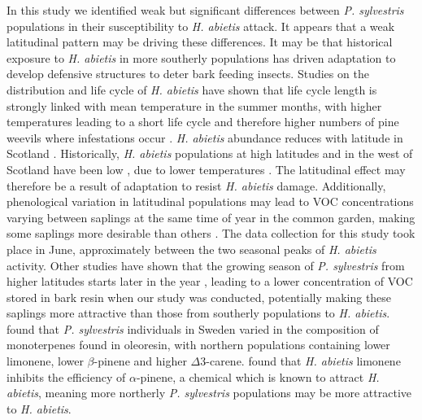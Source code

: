 \documentclass[a4paper, 11pt]{article}
\begin{document}
In this study we identified weak but significant differences between \textit{P. sylvestris} populations in their susceptibility to \textit{H. abietis} attack. It appears that a weak latitudinal pattern may be driving these differences. It may be that historical exposure to \textit{H. abietis} in more southerly populations has driven adaptation to develop defensive structures to deter bark feeding insects. Studies on the distribution and life cycle of \textit{H. abietis} have shown that life cycle length is strongly linked with mean temperature in the summer months, with higher temperatures leading to a short life cycle and therefore higher numbers of pine weevils where infestations occur \citep{Leather1999}. \textit{H. abietis} abundance reduces with latitude in Scotland \citep{Barredo2015}. Historically, \textit{H. abietis} populations at high latitudes and in the west of Scotland have been low \citep{Leather1999}, due to lower temperatures \citep{Wainhouse2014}. The latitudinal effect may therefore be a result of adaptation to resist \textit{H. abietis} damage. Additionally, phenological variation in latitudinal populations may lead to VOC concentrations varying between saplings at the same time of year in the common garden, making some saplings more desirable than others \citep{Guenther1997}. The data collection for this study took place in June, approximately between the two seasonal peaks of \textit{H. abietis} activity. Other studies have shown that the growing season of \textit{P. sylvestris} from higher latitudes starts later in the year \citep{Salmela2013}, leading to a lower concentration of VOC stored in bark resin when our study was conducted, potentially making these saplings more attractive than those from southerly populations to \textit{H. abietis}. \citet{Yazdani1985} found that \textit{P. sylvestris} individuals in Sweden varied in the composition of monoterpenes found in oleoresin, with northern populations containing lower limonene, lower $\beta$-pinene and higher $\Delta$3-carene. \citet{Nordlander1990} found that \textit{H. abietis} limonene inhibits the efficiency of $\alpha$-pinene, a chemical which is known to attract \textit{H. abietis}, meaning more northerly \textit{P. sylvestris} populations may be more attractive to \textit{H. abietis}.
\end{document}
